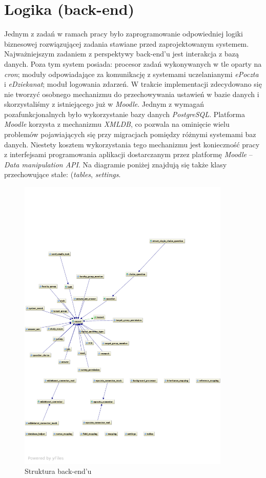 \section{Logika (back-end)}
\label{Chapter66}

Jednym z zadań w ramach pracy było zaprogramowanie odpowiedniej logiki biznesowej rozwiązującej zadania stawiane przed zaprojektowanym systemem. Najważniejszym zadaniem z perspektywy back-end'u jest interakcja z bazą danych. Poza tym system posiada: procesor zadań wykonywanych w tle oparty na \emph{cron}; moduły odpowiadające za komunikację z systemami uczelanianymi \emph{ePoczta} i \emph{eDziekanat}; moduł logowania zdarzeń. W trakcie implementacji zdecydowano się nie tworzyć osobnego mechanizmu do przechowywania ustawień w bazie danych i skorzystaliśmy z istniejącego już w \emph{Moodle}. Jednym z wymagań pozafunkcjonalnych było wykorzystanie bazy danych \emph{PostgreSQL}. Platforma \emph{Moodle} korzysta z mechanizmu \emph{XMLDB}, co pozwala na ominięcie wielu problemów pojawiających się przy migracjach pomiędzy różnymi systemami baz danych. Niestety kosztem wykorzystania tego mechanizmu jest konieczność pracy z interfejsami programowania aplikacji dostarczanym przez platformę \emph{Moodle} -- \emph{Data manipulation API}. Na diagramie poniżej znajdują się także klasy przechowujące stałe: (\emph{tables}, \emph{settings}.\\

\begin{figure}[H]
\begin{center}
\includegraphics[width=0.9\textwidth]{figures/lw/backend.pdf} 
\end{center}
\caption{Struktura back-end'u}
\label{fig:back-end}
\end{figure}

